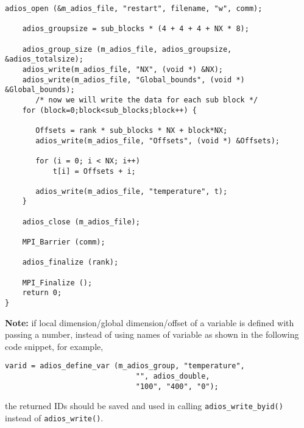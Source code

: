 \begin{lstlisting}[alsolanguage=C]
    adios_open (&m_adios_file, "restart", filename, "w", comm);

    adios_groupsize = sub_blocks * (4 + 4 + 4 + NX * 8);

    adios_group_size (m_adios_file, adios_groupsize, &adios_totalsize);
    adios_write(m_adios_file, "NX", (void *) &NX);
    adios_write(m_adios_file, "Global_bounds", (void *) &Global_bounds);
       /* now we will write the data for each sub block */
    for (block=0;block<sub_blocks;block++) {

       Offsets = rank * sub_blocks * NX + block*NX;
       adios_write(m_adios_file, "Offsets", (void *) &Offsets);

       for (i = 0; i < NX; i++)
           t[i] = Offsets + i;

       adios_write(m_adios_file, "temperature", t);
    }

    adios_close (m_adios_file);

    MPI_Barrier (comm);

    adios_finalize (rank);

    MPI_Finalize ();
    return 0;
}

\end{lstlisting}


\noindent \textbf{Note:} if local dimension/global 
dimension/offset of a variable is defined with passing a number, instead of using 
names of variable as shown in the following code snippet, for example,

\begin{lstlisting}[alsolanguage=C]
    varid = adios_define_var (m_adios_group, "temperature",
                              "", adios_double,
                              "100", "400", "0");
\end{lstlisting}

\noindent the returned IDs should be saved and used in calling \verb+adios_write_byid()+ instead of \verb+adios_write()+.
